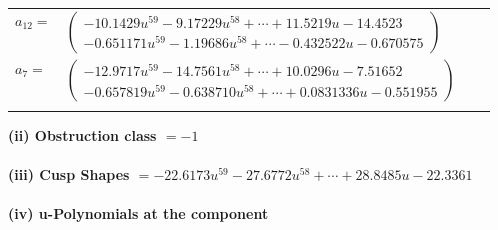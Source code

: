 \documentclass[1p]{elsarticle_modified}
\theoremstyle{definition}
\begin{document}
\begin{tabular}{m{7pt} m{180pt} m{7pt} m{180pt} }
\flushright $a_{12}=$&$\begin{pmatrix}-10.1429 u^{59}-9.17229 u^{58}+\cdots+11.5219 u-14.4523\\-0.651171 u^{59}-1.19686 u^{58}+\cdots-0.432522 u-0.670575\end{pmatrix}$ \\
\flushright $a_{7}=$&$\begin{pmatrix}-12.9717 u^{59}-14.7561 u^{58}+\cdots+10.0296 u-7.51652\\-0.657819 u^{59}-0.638710 u^{58}+\cdots+0.0831336 u-0.551955\end{pmatrix}$\\&\end{tabular}
\flushleft \textbf{(ii) Obstruction class $= -1$}\\~\\
\flushleft \textbf{(iii) Cusp Shapes $= -22.6173 u^{59}-27.6772 u^{58}+\cdots+28.8485 u-22.3361$}\\~\\
\newpage\renewcommand{\arraystretch}{1}
\flushleft \textbf{(iv) u-Polynomials at the component}\newline \\
\end{document}
